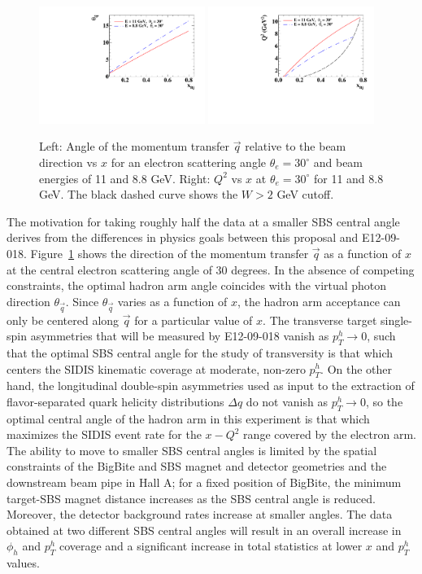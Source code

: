 \begin{figure}[h]
  \begin{center}
    \includegraphics[width=0.48\textwidth]{figures/thqxfig.pdf}
    \includegraphics[width=0.48\textwidth]{figures/Q2xfig.pdf}
  \end{center}
  \caption{\label{fig:thqx} Left: Angle of the momentum transfer $\vec{q}$ relative to the beam direction vs $x$ for an electron scattering angle $\theta_e = 30^\circ $ and beam energies of 11 and 8.8 GeV. Right: $Q^2$ vs $x$ at $\theta_e = 30^\circ$ for 11 and 8.8 GeV. The black dashed curve shows the $W > 2$ GeV cutoff.}
\end{figure}
The motivation for taking roughly half the data at a smaller SBS central angle derives from the differences in physics goals between this proposal and E12-09-018. Figure~\ref{fig:thqx} shows the direction of the momentum transfer $\vec{q}$ as a function of $x$ at the central electron scattering angle of 30 degrees. In the absence of competing constraints, the optimal hadron arm angle coincides with the virtual photon direction $\theta_{\vec{q}}$. Since $\theta_{\vec{q}}$ varies as a function of $x$, the hadron arm acceptance can only be centered along $\vec{q}$ for a particular value of $x$. The transverse target single-spin asymmetries that will be measured by E12-09-018 vanish as $p_T^h \rightarrow 0$, such that the optimal SBS central angle for the study of transversity is that which centers the SIDIS kinematic coverage at moderate, non-zero $p_T^h$. On the other hand, the longitudinal double-spin asymmetries used as input to the extraction of flavor-separated quark helicity distributions $\Delta q$ do not vanish as $p_T^h \rightarrow 0$, so the optimal central angle of the hadron arm in this experiment is that which maximizes the SIDIS event rate for the $x-Q^2$ range covered by the electron arm. The ability to move to smaller SBS central angles is limited by the spatial constraints of the BigBite and SBS magnet and detector geometries and the downstream beam pipe in Hall A; for a fixed position of BigBite, the minimum target-SBS magnet distance increases as the SBS central angle is reduced. Moreover, the detector background rates increase at smaller angles. The data obtained at two different SBS central angles will result in an overall increase in $\phi_h$ and $p_T^h$ coverage and a significant increase in total statistics at lower $x$ and $p_T^h$ values. 
